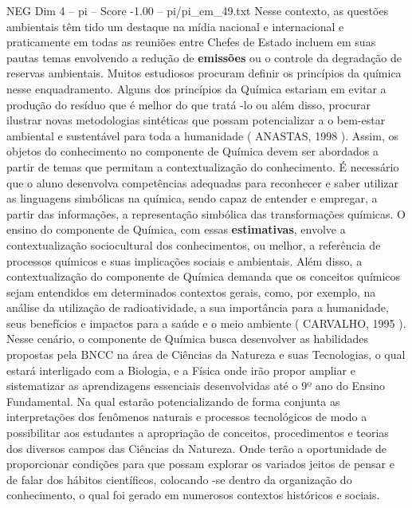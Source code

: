 \begin{textsample}{NEG Dim 4 – pi – Score -1.00 – pi/pi\_em\_49.txt}
Nesse contexto, as questões ambientais têm tido um destaque na mídia nacional e internacional e praticamente em todas as reuniões entre Chefes de Estado incluem em suas pautas temas envolvendo a redução de \textbf{emissões} ou o controle da degradação de reservas ambientais.
Muitos estudiosos procuram definir os princípios da química nesse enquadramento.
Alguns dos princípios da Química estariam em evitar a produção do resíduo que é melhor do que tratá -lo ou além disso, procurar ilustrar novas metodologias sintéticas que possam potencializar a o bem-estar ambiental e sustentável para toda a humanidade ( ANASTAS, 1998 ).
Assim, os objetos do conhecimento no componente de Química devem ser abordados a partir de temas que permitam a contextualização do conhecimento.
É necessário que o aluno desenvolva competências adequadas para reconhecer e saber utilizar as linguagens simbólicas na química, sendo capaz de entender e empregar, a partir das informações, a representação simbólica das transformações químicas.
O ensino do componente de Química, com essas \textbf{estimativas}, envolve a contextualização sociocultural dos conhecimentos, ou melhor, a referência de processos químicos e suas implicações sociais e ambientais.
Além disso, a contextualização do componente de Química demanda que os conceitos químicos sejam entendidos em determinados contextos gerais, como, por exemplo, na análise da utilização de radioatividade, a sua importância para a humanidade, seus benefícios e impactos para a saúde e o meio ambiente ( CARVALHO, 1995 ).
Nesse cenário, o componente de Química busca desenvolver as habilidades propostas pela BNCC na área de Ciências da Natureza e suas Tecnologias, o qual estará interligado com a Biologia, e a Física onde irão propor ampliar e sistematizar as aprendizagens essenciais desenvolvidas até o 9º ano do Ensino Fundamental.
Na qual estarão potencializando de forma conjunta as interpretações dos fenômenos naturais e processos tecnológicos de modo a possibilitar aos estudantes a apropriação de conceitos, procedimentos e teorias dos diversos campos das Ciências da Natureza.
Onde terão a oportunidade de proporcionar condições para que possam explorar os variados jeitos de pensar e de falar dos hábitos científicos, colocando -se dentro da organização do conhecimento, o qual foi gerado em numerosos contextos históricos e sociais.

\end{textsample}
